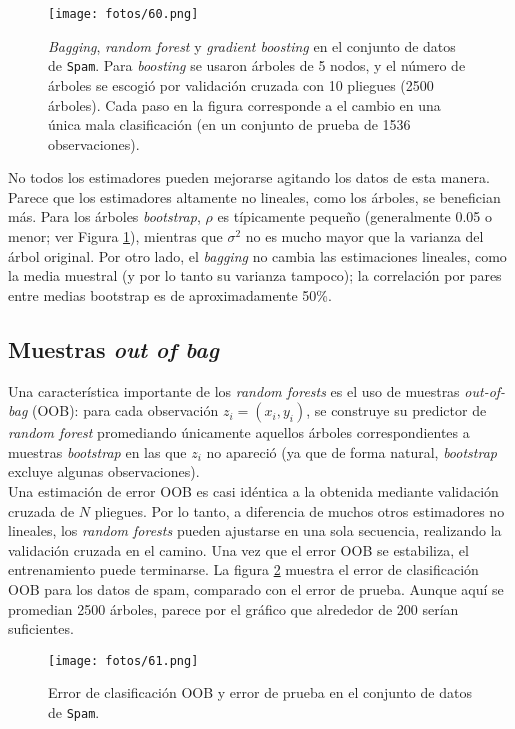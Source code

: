 \begin{figure}[h]
\centering
\texttt{[image: fotos/60.png]}
\caption{\textit{Bagging}, \textit{random forest} y \textit{gradient boosting} en el conjunto de datos de \texttt{Spam}. Para \textit{boosting} se usaron árboles de 5 nodos, y el número de árboles se escogió por validación cruzada con 10 pliegues (2500 árboles). Cada paso en la figura corresponde a el cambio en una única mala clasificación (en un conjunto de prueba de 1536 observaciones).}
\label{fig:20.9}
\end{figure}

No todos los estimadores pueden mejorarse agitando los datos de esta manera. Parece que los estimadores altamente no lineales, como los árboles, se benefician más. Para los árboles \textit{bootstrap}, $\rho$ es típicamente pequeño (generalmente 0.05 o menor; ver Figura \ref{fig:20.9}), mientras que $\sigma^2$ no es mucho mayor que la varianza del árbol original. Por otro lado, el \textit{bagging} no cambia las estimaciones lineales, como la media muestral (y por lo tanto su varianza tampoco); la correlación por pares entre medias bootstrap es de aproximadamente 50\%. 

\subsection{Muestras \textit{out of bag}}

Una característica importante de los \textit{random forests} es el uso de muestras \textit{out-of-bag} (OOB): para cada observación $z_i = (x_i, y_i)$, se construye su predictor de \textit{random forest} promediando únicamente aquellos árboles correspondientes a muestras \textit{bootstrap} en las que $z_i$ no apareció (ya que de forma natural, \textit{bootstrap} excluye algunas observaciones). \\

Una estimación de error OOB es casi idéntica a la obtenida mediante validación cruzada de $N$ pliegues. Por lo tanto, a diferencia de muchos otros estimadores no lineales, los \textit{random forests} pueden ajustarse en una sola secuencia, realizando la validación cruzada en el camino. Una vez que el error OOB se estabiliza, el entrenamiento puede terminarse. La figura \ref{fig:20.4} muestra el error de clasificación OOB para los datos de spam, comparado con el error de prueba. Aunque aquí se promedian 2500 árboles, parece por el gráfico que alrededor de 200 serían suficientes.

\begin{figure}[h]
\centering
\texttt{[image: fotos/61.png]}
\caption{Error de clasificación OOB y error de prueba en el conjunto de datos de \texttt{Spam}.}
\label{fig:20.4}
\end{figure}


